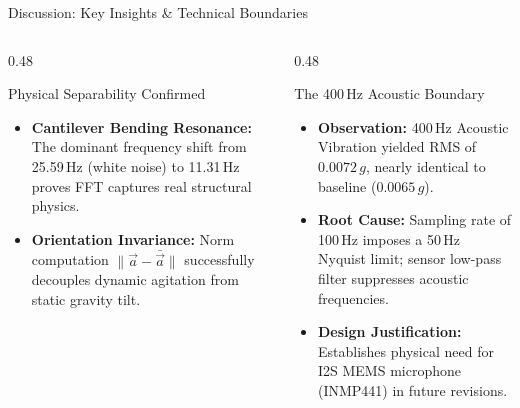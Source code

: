 \documentclass[aspectratio=169, 10pt]{beamer}
\begin{document}
\begin{frame}{Discussion: Key Insights \& Technical Boundaries}
    \begin{columns}[T]
        \begin{column}{0.48\textwidth}
            \begin{block}{Physical Separability Confirmed}
                \begin{itemize}
                    \item \textbf{Cantilever Bending Resonance:} The dominant frequency shift from 25.59\,Hz (white noise) to 11.31\,Hz proves FFT captures real structural physics.
                    \item \textbf{Orientation Invariance:} Norm computation $\|\vec{a} - \bar{\vec{a}}\|$ successfully decouples dynamic agitation from static gravity tilt.
                \end{itemize}
            \end{block}
        \end{column}
        \begin{column}{0.48\textwidth}
            \begin{alertblock}{The 400\,Hz Acoustic Boundary}
                \begin{itemize}
                    \item \textbf{Observation:} 400\,Hz Acoustic Vibration yielded RMS of $0.0072\,g$, nearly identical to baseline ($0.0065\,g$).
                    \item \textbf{Root Cause:} Sampling rate of 100\,Hz imposes a 50\,Hz Nyquist limit; sensor low-pass filter suppresses acoustic frequencies.
                    \item \textbf{Design Justification:} Establishes physical need for I2S MEMS microphone (INMP441) in future revisions.
                \end{itemize}
            \end{alertblock}
        \end{column}
    \end{columns}
\end{frame}
\end{document}
